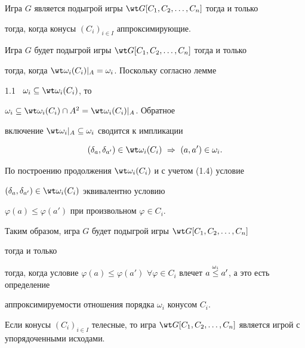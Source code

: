  


\begin{lems} 


Игра $G$ является подыгрой игры $\wt G[C_1,C_2,\dotsc,C_n]$ тогда и только 


тогда, когда конусы $(C_i)_{i\in I}$ аппроксимирующие. 


\end{lems} 


 


\begin{pf} 


Игра $G$ будет подыгрой игры $\wt G[C_1,C_2,\dotsc,C_n]$ тогда и только 


тогда, когда $\wt\omega_i(C_i)|_A=\omega_i$. Поскольку согласно лемме 


1.1 \ $\omega_i\subseteq\wt\omega_i(C_i)$, то 


$\omega_i\subseteq\wt\omega_i(C_i)\cap A^2=\wt\omega_i(C_i)|_A$. Обратное 


включение $\wt\omega_i|_A\subseteq\omega_i$ сводится к импликации 


$$ 


(\delta_a,\delta_{a'})\in\wt\omega_i(C_i)\ \Rightarrow 


\ (a,a')\in\omega_i. 


$$ 


 


По построению продолжения $\wt\omega_i(C_i)$ и с учетом (1.4) условие 


$(\delta_a,\delta_{a'})\in\wt\omega_i(C_i)$ эквивалентно условию 


$\varphi(a)\le\varphi(a')$ при произвольном $\varphi\in C_i$. 


Таким образом, игра $G$ будет подыгрой игры $\wt G[C_1,C_2,\dotsc,C_n]$ 


тогда и только 


тогда, когда условие $\varphi(a)\le\varphi(a')$\; $\forall\varphi\in 


C_i$ влечет $a\up{\omega_i}{\le}a'$, а это есть определение 


аппроксимируемости отношения порядка $\omega_i$ конусом $C_i$. 


\end{pf} 


 


\begin{lems} 


Если конусы $(C_i)_{i\in I}$ телесные, то игра $\wt 


G[C_1,C_2,\dotsc,C_n]$ является игрой с упорядоченными исходами. 


\end{lems} 


